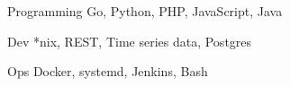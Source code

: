 

\begin{cvskills}

  \cvskill
    {Programming} %
    {Go, Python, PHP, JavaScript, Java} %

  \cvskill
    {Dev} %
    {*nix, REST, Time series data, Postgres} %
    
  \cvskill
    {Ops}
    {Docker, systemd, Jenkins, Bash}


\end{cvskills}
